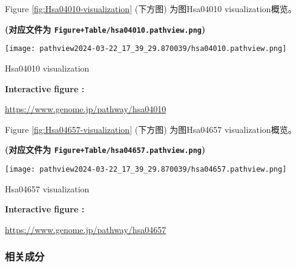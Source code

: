 \documentclass[
]{article}
\begin{document}
Figure \ref{fig:Hsa04010-visualization} (下方图) 为图Hsa04010 visualization概览。

\textbf{(对应文件为 \texttt{Figure+Table/hsa04010.pathview.png})}

\def\@captype{figure}
\begin{center}
\texttt{[image: pathview2024-03-22\_17\_39\_29.870039/hsa04010.pathview.png]}
\caption{Hsa04010 visualization}\label{fig:Hsa04010-visualization}
\end{center}
\begin{center}\begin{tcolorbox}[colback=gray!10, colframe=gray!50, width=0.9\linewidth, arc=1mm, boxrule=0.5pt]
\textbf{
Interactive figure
:}

\vspace{0.5em}

    \url{https://www.genome.jp/pathway/hsa04010}

\vspace{2em}
\end{tcolorbox}
\end{center}

Figure \ref{fig:Hsa04657-visualization} (下方图) 为图Hsa04657 visualization概览。

\textbf{(对应文件为 \texttt{Figure+Table/hsa04657.pathview.png})}

\def\@captype{figure}
\begin{center}
\texttt{[image: pathview2024-03-22\_17\_39\_29.870039/hsa04657.pathview.png]}
\caption{Hsa04657 visualization}\label{fig:Hsa04657-visualization}
\end{center}
\begin{center}\begin{tcolorbox}[colback=gray!10, colframe=gray!50, width=0.9\linewidth, arc=1mm, boxrule=0.5pt]
\textbf{
Interactive figure
:}

\vspace{0.5em}

    \url{https://www.genome.jp/pathway/hsa04657}

\vspace{2em}
\end{tcolorbox}
\end{center}

\hypertarget{ux76f8ux5173ux6210ux5206}{%
\subsubsection{相关成分}\label{ux76f8ux5173ux6210ux5206}}
\end{document}

